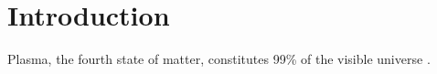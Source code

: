 \chapter*{Introduction}



Plasma, the fourth state of matter, constitutes 99\% of the visible universe \cite{plasma-intro}. 